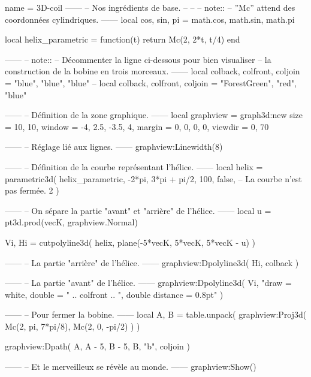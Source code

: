\documentclass[varwidth]{standalone}
\begin{document}
\begin{luadraw}{name = 3D-coil}
------
-- Nos ingrédients de base.
--
--
-- note::
--     ''Mc'' attend des coordonnées cylindriques.
------
local cos, sin, pi = math.cos, math.sin, math.pi

local helix_parametric = function(t)
  return Mc(2, 2*t, t/4)
end

------
-- note::
--     Décommenter la ligne ci-dessous pour bien visualiser
--     la construction de la bobine en trois morceaux.
------
local colback, colfront, coljoin = "blue", "blue", "blue"
-- local colback, colfront, coljoin = "ForestGreen", "red", "blue"

------
-- Définition de la zone graphique.
------
local graphview = graph3d:new{
  size    = {10, 10},
  window  = {-4, 2.5, -3.5, 4},
  margin  = {0, 0, 0, 0},
  viewdir = {0, 70}
}

------
-- Réglage lié aux lignes.
------
graphview:Linewidth(8)

------
-- Définition de la courbe représentant l'hélice.
------
local helix = parametric3d(
  helix_parametric,
  -2*pi, 3*pi + pi/2, 100,
  false,  -- La courbe n'est pas fermée.
  2
)

------
-- On sépare la partie "avant" et "arrière" de l'hélice.
------
local u = pt3d.prod(vecK, graphview.Normal)

Vi, Hi = cutpolyline3d(
  helix,
  plane(-5*vecK, 5*vecK, 5*vecK - u)
)

------
-- La partie "arrière" de l'hélice.
------
graphview:Dpolyline3d(
  Hi,
  colback
)

------
-- La partie "avant" de l'hélice.
------
graphview:Dpolyline3d(
  Vi,
     "draw = white, double = "
  .. colfront
  .. ", double distance = 0.8pt"
)

------
-- Pour fermer la bobine.
------
local A, B = table.unpack(
  graphview:Proj3d({
    Mc(2, pi, 7*pi/8),
    Mc(2, 0, -pi/2)
  })
)

graphview:Dpath(
  {A, A - 5, B - 5, B, "b"},
  coljoin
)

------
-- Et le merveilleux se révèle au monde.
------
graphview:Show()
\end{luadraw}
\end{document}
